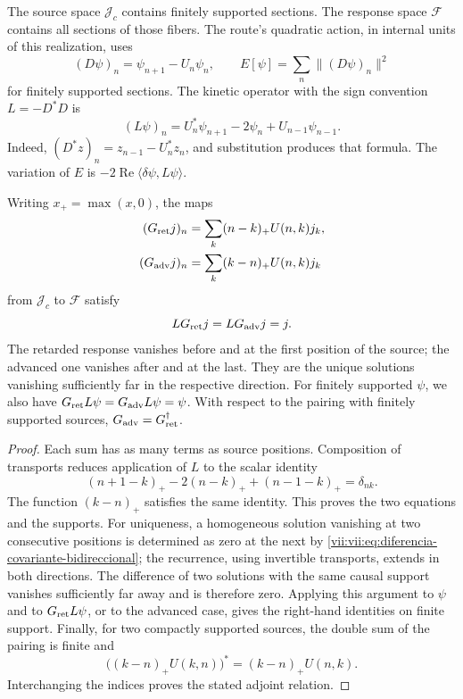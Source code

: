 The source space \(\mathcal J_c\) contains finitely supported
sections. The response space \(\mathcal F\) contains all
sections of those fibers. The route's quadratic action, in internal
units of this realization, uses
\[
 (D\psi)_n=\psi_{n+1}-U_n\psi_n,\qquad
 E[\psi]=\sum_n\|(D\psi)_n\|^2
\]
for finitely supported sections. The kinetic operator with the sign
convention \(L=-D^*D\) is
\begin{equation}
 (L\psi)_n=U_n^*\psi_{n+1}-2\psi_n+U_{n-1}\psi_{n-1}.
 \label{vii:vii:eq:diferencia-covariante-bidireccional}
\end{equation}
Indeed, \((D^*z)_n=z_{n-1}-U_n^*z_n\), and substitution produces
that formula. The variation of \(E\) is
\(-2\operatorname{Re}\langle\delta\psi,L\psi\rangle\).

\begin{theorem}
\label{vii:vii:thm:green-cronologico}
Writing \(x_+=\max(x,0)\), the maps
\begin{align}
 (G_{\rm ret}j)_n&=\sum_k(n-k)_+U(n,k)j_k,\label{vii:vii:eq:green-ret-cronologico}\\
 (G_{\rm adv}j)_n&=\sum_k(k-n)_+U(n,k)j_k\label{vii:vii:eq:green-adv-cronologico}
\end{align}
from \(\mathcal J_c\) to \(\mathcal F\) satisfy
\[
 LG_{\rm ret}j=LG_{\rm adv}j=j.
\]
The retarded response vanishes before and at the first position of the
source; the advanced one vanishes after and at the last. They are the unique
solutions vanishing sufficiently far in the respective direction.
For finitely supported \(\psi\), we also have
\(G_{\rm ret}L\psi=G_{\rm adv}L\psi=\psi\).
With respect to the pairing with finitely supported sources,
\(G_{\rm adv}=G_{\rm ret}^{\dagger}\).
\end{theorem}
\begin{proof}
Each sum has as many terms as source positions.
Composition of transports reduces application of \(L\) to
the scalar identity
\[
 (n+1-k)_+-2(n-k)_++(n-1-k)_+=\delta_{nk}.
\]
The function \((k-n)_+\) satisfies the same identity. This proves
the two equations and the supports. For uniqueness, a homogeneous
solution vanishing at two consecutive positions is determined
as zero at the next by \eqref{vii:vii:eq:diferencia-covariante-bidireccional};
the recurrence, using invertible transports, extends in both
directions. The difference of two solutions with the same causal support
vanishes sufficiently far away and is therefore zero.
Applying this argument to \(\psi\) and to \(G_{\rm ret}L\psi\), or to the
advanced case, gives the right-hand identities on finite support.
Finally, for two compactly supported sources, the double sum of the pairing
is finite and
\[
 \bigl((k-n)_+U(k,n)\bigr)^*=(k-n)_+U(n,k).
\]
Interchanging the indices proves the stated adjoint relation.
\end{proof}


